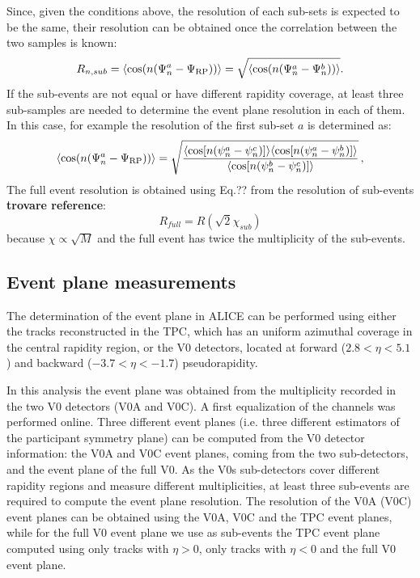 Since, given the conditions above, the resolution of each sub-sets is expected 
to be the same, their resolution can be obtained 
once the correlation between the two samples is known:
\begin{equation}
R_{n, sub} = \langle {\rm cos} (n({\rm \Psi}^a_n-{\rm \Psi}_{\rm RP})) \rangle = \sqrt{\langle {\rm cos} (n({\rm \Psi}^a_n-{\rm \Psi}^b_n)) \rangle}.
\end{equation}
If the sub-events are not equal or have different rapidity coverage,
at least three sub-samples are needed to determine the 
event plane resolution in each of them. In this case, 
for example the resolution of the first sub-set $a$ is determined as:
\begin{equation}
 \langle {\rm cos} (n({\rm \Psi}^a_n-{\rm \Psi}_{\rm RP})) \rangle = 
\sqrt{\frac{\langle\cos [n(\psi_n^a-\psi_n^c)] \rangle \langle\cos [n(\psi_n^a-\psi_n^b)] \rangle}{\langle\cos [n(\psi_n^b-\psi_n^c)] \rangle}}\,,
\end{equation}
The full event resolution is obtained using 
Eq.?? from the resolution of sub-events {\bf trovare reference}:
\begin{equation}
R_{full} = R(\sqrt{2}\chi_{sub})
\end{equation}
because $\chi \propto \sqrt{M}$ and the full event has twice the multiplicity of the sub-events.\\

\subsection{Event plane measurements}

The determination of the event plane in ALICE can be performed using
either the tracks reconstructed in the TPC, which has an uniform
azimuthal coverage in the central rapidity region, or the V0
detectors, located at forward ($2.8<\eta<5.1$) and backward
($-3.7<\eta<-1.7$) pseudorapidity.

In this analysis the event plane was obtained from the 
multiplicity recorded in the two V0 detectors 
(V0A and V0C). A first equalization of the channels 
was performed online. Three different event planes 
(i.e. three different estimators of the participant symmetry plane) 
can be computed from the V0 detector information: 
the V0A and V0C event planes, coming from 
the two sub-detectors, and the event plane of the full V0. 
As the V0s sub-detectors cover different rapidity 
regions and measure different multiplicities, at least 
three sub-events are required to compute the event
 plane resolution. The resolution of the V0A (V0C) 
 event planes can be obtained using the V0A, 
 V0C and the TPC event planes, while for the full 
 V0 event plane we use as sub-events the TPC 
 event plane computed using only tracks with $\eta>0$, 
 only tracks with $\eta<0$ and the full V0 event plane. \\
 

